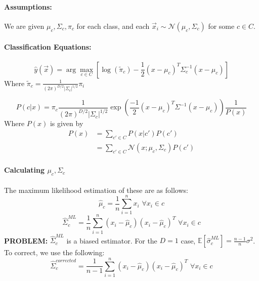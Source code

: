 \documentclass[a4paper,12pt]{report}
\begin{document}
\paragraph{Assumptions: } We are given $\mu_c, \Sigma_c, \pi_c$ for each class, and each $\vec x_i \sim \mathcal N(\mu_c, \Sigma_c)$ for some $c\in C$.

\paragraph{Classification Equations: } 
\begin{equation}
\hat y(\vec x) = \arg\max_{c\in C} [\log (\tilde \pi_c) - \frac{1}{2} (x-\mu_c)^T \Sigma^{-1}_c (x-\mu_c)]
\end{equation}
Where $\tilde \pi_c = \frac{1}{(2\pi)^{D/2} |\Sigma_c|^{1/2}} \pi_i$

\begin{equation}
P(c | x) = \pi_c \frac{1}{(2\pi)^{D/2} |\Sigma_c|^{1/2} } \exp(\frac{-1}{2} (x-\mu_c)^T \Sigma^{-1} (x - \mu_c))\frac{1}{P(x)} 
\end{equation}
Where $P(x)$ is given by
\begin{equation}
\begin{split}
P(x) &= \sum_{c'\in C}^{} P(x | c')P(c') \\
&= \sum_{c'\in C}^{} \mathcal N(x; \mu_c, \Sigma_c) P(c')
\end{split}
\end{equation}

\paragraph{Calculating $\mu_c, \Sigma_c$} 

The maximum likelihood estimation of these are as follows: 
\begin{equation}
\hat\mu_c = \frac{1}{n} \sum_{i=1}^{n} x_i \,\, \forall x_i \in c
\end{equation}
\begin{equation}
\hat \Sigma_c^{ML} = \frac{1}{n} \sum_{i=1}^{n} (x_i - \hat \mu_c)(x_i - \hat\mu_c)^T\,\, \forall x_i \in c
\end{equation}
\textbf{PROBLEM:} $\hat \Sigma_c^{ML}$ is a biased estimator. For the $D=1$ case, $\mathbb E[\hat \sigma_c^{ML}] = \frac{n-1}{n} \sigma^2$. To correct, we use the following:
\begin{equation}
\hat \Sigma_c^{corrected} = \frac{1}{n-1} \sum_{i=1}^{n} (x_i - \hat \mu_c)(x_i - \hat\mu_c)^T\,\, \forall x_i \in c
\end{equation}
\end{document}

